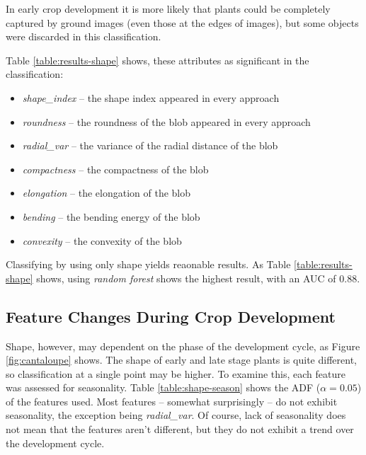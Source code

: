 \documentclass[letterpaper]{report}
\begin{document}
In early crop development it is more likely that plants could be completely captured by ground images (even those at the edges of images), but some objects were discarded in this classification.

 Table \ref{table:results-shape} shows, these attributes as significant in the classification:
\begin{itemize}
	\item{\textit{shape\_index} -- the shape index appeared in every approach}
	\item{\textit{roundness} -- the roundness of the blob appeared in every approach}
	\item{\textit{radial\_var} -- the variance of the radial distance of the blob}
	\item{\textit{compactness} -- the compactness of the blob}
	\item{\textit{elongation} -- the elongation of the blob}
	\item{\textit{bending} -- the bending energy of the blob}
	\item{\textit{convexity} -- the convexity of the blob}
\end{itemize}

Classifying by using only shape yields reaonable results. As Table \ref{table:results-shape} shows, using \textit{random forest} shows the highest result, with an AUC of 0.88. 

{
\renewcommand{\arraystretch}{0.9}

}

\subsection{Feature Changes During Crop Development}
Shape, however, may dependent on the phase of the development cycle, as Figure \ref{fig:cantaloupe} shows. The shape of early and late stage plants is quite different, so classification at a single point may be higher.  To examine this, each feature was assessed for seasonality. Table \ref{table:shape-season} shows the ADF ($\alpha = 0.05$) of the features used.  Most features -- somewhat surprisingly -- do not exhibit seasonality, the exception being \textit{radial\_var}. Of course, lack of seasonality does not mean that the features aren't different, but they do not exhibit a trend over the development cycle.
\end{document}
